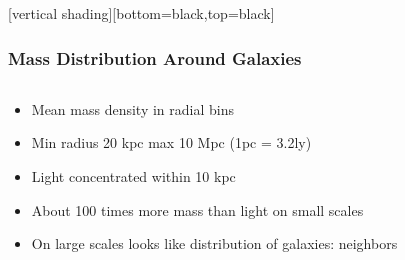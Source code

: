 \documentclass{beamer}
\begin{document}
{
    [vertical shading][bottom=black,top=black]


    \frame
    {
        \frametitle{Mass Distribution Around Galaxies}

        \begin{columns}
            \begin{column}{0.5\textwidth}    
                \begin{itemize}

                    \item Mean mass density in radial bins

                    \item Min radius 20 kpc max 10 Mpc (1pc = 3.2ly)

                    \item Light concentrated within 10 kpc

                    \item About 100 times more mass than light on small scales

                    \item On large scales looks like distribution of galaxies:
                        neighbors



\end{itemize}
\end{column}
\end{columns}}}
\end{document}

